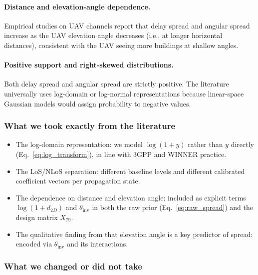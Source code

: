 \documentclass[11pt,a4paper]{article}
\begin{document}
\paragraph{Distance and elevation-angle dependence.}
Empirical studies on UAV channels \cite{cai2019,izydorczyk2019} report that
delay spread and angular spread increase as the UAV elevation angle decreases
(i.e., at longer horizontal distances), consistent with the UAV seeing more
buildings at shallow angles.

\paragraph{Positive support and right-skewed distributions.}
Both delay spread and angular spread are strictly positive. The literature
universally uses log-domain or log-normal representations because linear-space
Gaussian models would assign probability to negative values.

\subsubsection{What we took exactly from the literature}

\begin{itemize}
\item The log-domain representation: we model $\log(1+y)$ rather than $y$
      directly (Eq.~\ref{eq:log_transform}), in line with 3GPP and WINNER
      practice.
\item The LoS/NLoS separation: different baseline levels and different
      calibrated coefficient vectors per propagation state.
\item The dependence on distance and elevation angle: included as explicit
      terms $\log(1+d_{2D})$ and $\theta_{\mathrm{inv}}$ in both the raw
      prior (Eq.~\ref{eq:raw_spread}) and the design matrix $X_{79}$.
\item The qualitative finding from \cite{cai2019,izydorczyk2019} that
      elevation angle is a key predictor of spread: encoded via
      $\theta_{\mathrm{inv}}$ and its interactions.
\end{itemize}

\subsubsection{What we changed or did not take}
\end{document}
